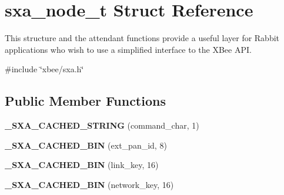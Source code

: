 \hypertarget{structsxa__node__t}{}\section{sxa\+\_\+node\+\_\+t Struct Reference}
\label{structsxa__node__t}


This structure and the attendant functions provide a useful layer for Rabbit applications who wish to use a simplified interface to the X\+Bee A\+PI.  




{\ttfamily \#include \char`\"{}xbee/sxa.\+h\char`\"{}}

\subsection*{Public Member Functions}
\begin{DoxyCompactItemize}
\item 
\mbox{\label{structsxa__node__t_a8e784384cf9ff8c8972ae68e501e05c4}} 
{\bfseries \+\_\+\+S\+X\+A\+\_\+\+C\+A\+C\+H\+E\+D\+\_\+\+S\+T\+R\+I\+NG} (command\+\_\+char, 1)
\item 
\mbox{\label{structsxa__node__t_a72344c6c328b655270d31a7aa74a0c7e}} 
{\bfseries \+\_\+\+S\+X\+A\+\_\+\+C\+A\+C\+H\+E\+D\+\_\+\+B\+IN} (ext\+\_\+pan\+\_\+id, 8)
\item 
\mbox{\label{structsxa__node__t_a54caac55fa94d32e26c54447a064ebee}} 
{\bfseries \+\_\+\+S\+X\+A\+\_\+\+C\+A\+C\+H\+E\+D\+\_\+\+B\+IN} (link\+\_\+key, 16)
\item 
\mbox{\label{structsxa__node__t_a18c56e9dac1d18c895c0989b85b583ae}} 
{\bfseries \+\_\+\+S\+X\+A\+\_\+\+C\+A\+C\+H\+E\+D\+\_\+\+B\+IN} (network\+\_\+key, 16)
\end{DoxyCompactItemize}
